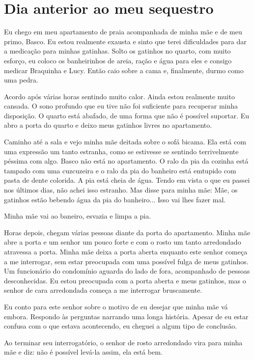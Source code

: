 \documentclass[11pt]{book}
\begin{document}
\chapter{Dia anterior ao meu sequestro}

Eu chego em meu apartamento de praia acompanhada de minha mãe e de meu primo, Basco. Eu estou realmente exausta e sinto que terei dificuldades para dar a medicação para minhas gatinhas. Solto os gatinhos no quarto, com muito esforço, eu coloco os banheirinhos de areia, ração e água para eles e consigo medicar Braquinha e Lucy. Então caio sobre a cama e, finalmente, durmo como uma pedra.

Acordo após várias horas sentindo muito calor. Ainda estou realmente muito cansada. O sono profundo que eu tive não foi suficiente para recuperar minha disposição. O quarto está abafado, de uma forma que não é possível suportar. Eu abro a porta do quarto e deixo meus gatinhos livres no apartamento. 

Caminho até a sala e vejo minha mãe deitada sobre o sofá bicama. Ela está com uma expressão um tanto estranha, como se estivesse se sentindo terrivelmente péssima com algo. Basco não está no apartamento. O ralo da pia da cozinha está tampado com uma cuzcuzeira e o ralo da pia do banheiro está emtupido com pasta de dente colorida. A pia está cheia de água. Tendo em vista o que eu passei nos últimos dias, não achei isso estranho. Mas disse para minha mãe: Mãe, os gatinhos estão bebendo água da pia do banheiro... Isso vai lhes fazer mal. 

Minha mãe vai ao baneiro, esvazia e limpa a pia.

Horas depois, chegam várias pessoas diante da porta do apartamento. Minha mãe abre a porta e um senhor um pouco forte e com o rosto um tanto arredondado atravessa a porta. Minha mãe deixa a porta aberta enquanto este senhor começa a me interrogar, sem estar preocupada com uma possível fulga de meus gatinhos. Um funcionário do condomínio aguarda do lado de fora, acompanhado de pessoas desconhecidas. Eu estou preocupada com a porta aberta e meus gatinhos, mas o senhor de cara arredondada começa a me interrogar bruscamente.

Eu conto para este senhor sobre o motivo de eu desejar que minha mãe vá embora. Respondo às perguntas narrando uma longa história. Apesar de eu estar confusa com o que estava acontecendo, eu cheguei a algum tipo de conclusão. 

Ao terminar seu interrogatório, o senhor de rosto arredondado vira para minha mãe e diz: não é possível levá-la assim, ela está bem.
\end{document}
